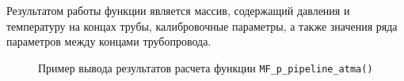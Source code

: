 
Результатом работы функции является массив, содержащий давления и температуру на концах трубы, калибровочные параметры, а также значения ряда параметров между концами трубопровода.

\begin{figure}[ht]
	\caption{Пример вывода результатов расчета функции \texttt{MF_p_pipeline_atma()}}
	\label{ris:pipeline_out_example}
\end{figure}


\newpage

